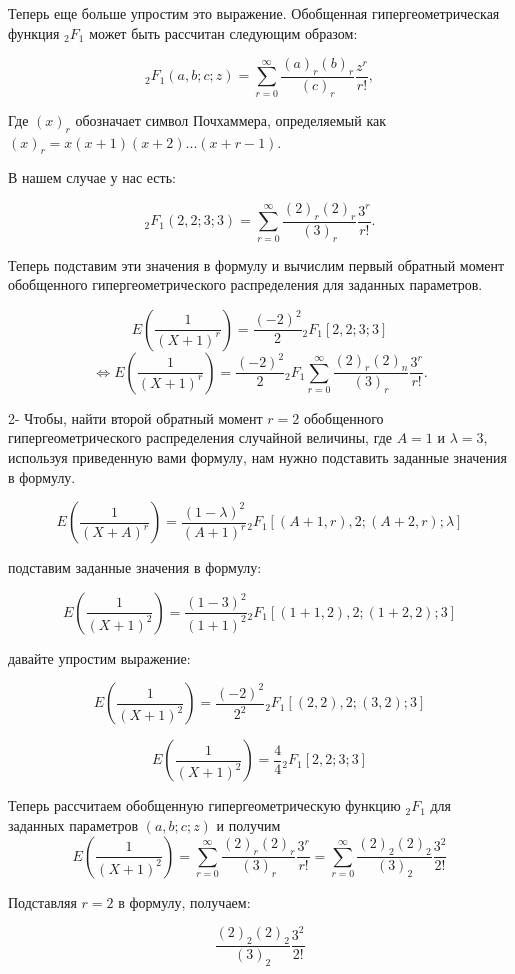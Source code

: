 \documentclass[13pt]{article}
\begin{document}
Теперь еще больше упростим это выражение. Обобщенная гипергеометрическая функция \( {}_2F_{1} \) может быть рассчитан следующим образом:

\[ {}_2F_{1}(a,b;c;z) = \sum_{r=0}^{\infty} \frac{(a)_r (b)_r}{(c)_r} \frac{z^r}{r!}, \]

Где \( (x)_r \) обозначает символ Почхаммера, определяемый как \( (x)_r = x(x+1)(x+2)...(x+r-1) \).

В нашем случае у нас есть:

\[ {}_2F_{1}(2,2;3;3) = \sum_{r=0}^{\infty} \frac{(2)_r (2)_r}{(3)_r} \frac{3^r}{r!}. \]

Теперь подставим эти значения в формулу и вычислим первый обратный момент обобщенного гипергеометрического распределения для заданных параметров.\par

\[ E\left(\frac{1}{(X+1)^r}\right) = \frac{(-2)^2}{2} {}_2F_{1}\left[2,2;3;3\right] \]
\[
\Longleftrightarrow  E\left(\frac{1}{(X+1)^r}\right) = \frac{(-2)^2}{2} {}_2F_{1}\sum_{r=0}^{\infty} \frac{(2)_r (2)_n}{(3)_r} \frac{3^r}{r!}.
\]

2- Чтобы, найти второй обратный момент \(r= 2\) обобщенного гипергеометрического распределения случайной величины, где \(A = 1\) и \(\lambda = 3\), используя приведенную вами формулу, нам нужно подставить заданные значения в формулу.

\[ E\left(\frac{1}{(X+A)^r}\right) = \frac{(1-\lambda)^2}{(A+1)^r}{}_2F_1 \left[(A+1,r),2;(A+2,r);\lambda \right] \]

подставим заданные значения в формулу:

\[ E\left(\frac{1}{(X+1)^2}\right) = \frac{(1-3)^2}{(1+1)^2}{}_2F_1 \left[(1+1,2),2;(1+2,2);3 \right] \]

давайте упростим выражение:

\[ E\left(\frac{1}{(X+1)^2}\right) = \frac{(-2)^2}{2^2}{}_2F_1 \left[ (2,2), 2; (3,2); 3 \right] \]

\[ E\left(\frac{1}{(X+1)^2}\right) = \frac{4}{4}{}_2F_1 \left[ 2, 2; 3; 3 \right] \]

Теперь рассчитаем обобщенную гипергеометрическую функцию \({}_2F_{1}\) для заданных параметров \((a,b;c;z)\) и получим 
\[ 
E\left(\frac{1}{(X+1)^2}\right) =  \sum_{r=0}^{\infty} \frac{(2)_r (2)_r}{(3)_r} \frac{3^r}{r!} = \sum_{r=0}^{\infty} \frac{(2)_2 (2)_2}{(3)_2} \frac{3^2}{2!}
\]

Подставляя \(r=2\) в формулу, получаем:

\[ \frac{(2)_2 (2)_2}{(3)_2} \frac{3^2}{2!} \]
\end{document}
